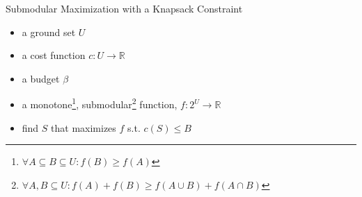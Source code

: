 \begin{frame}{Submodular Maximization with a Knapsack Constraint}
    \begin{itemize}[<+>]
        \item a ground set $U$
        \item a cost function $c:U \to \mathbb{R}$
        \item a budget $\beta$
        \item a monotone\footnote{
                $\forall A \subseteq B \subseteq U: f(B) \geq f(A)$
            }, submodular\footnote{
                $\forall A, B \subseteq U: f(A) + f(B) \geq f(A \cup B) + f(A \cap B)$
            } function, $f:2^U \to \mathbb{R}$
        \item find $S$ that maximizes $f$ s.t. $c(S) \leq B$
    \end{itemize}
\end{frame}

